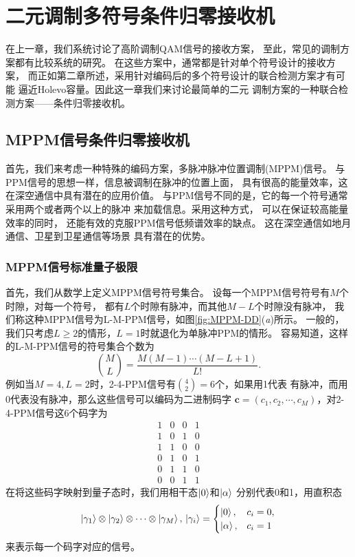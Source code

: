 \chapter{二元调制多符号条件归零接收机}
\label{chp:cpn}
在上一章，我们系统讨论了高阶调制QAM信号的接收方案，
至此，常见的调制方案都有比较系统的研究。
在这些方案中，通常都是针对单个符号设计的接收方案，
而正如第二章所述，采用针对编码后的多个符号设计的联合检测方案才有可能
逼近Holevo容量。因此这一章我们来讨论最简单的二元
调制方案的一种联合检测方案——条件归零接收机。


\section{MPPM信号条件归零接收机}
首先，我们来考虑一种特殊的编码方案，多脉冲脉冲位置调制(MPPM)信号。
与PPM信号的思想一样，信息被调制在脉冲的位置上面，
具有很高的能量效率，这在深空通信中具有潜在的应用价值\cite{hemmati2006deep}。
与PPM信号不同的是，它的每一个符号通常采用两个或者两个以上的脉冲
来加载信息。采用这种方式，
可以在保证较高能量效率的同时，
还能有效的克服PPM信号低频谱效率的缺点\cite{sugiyama1989mppm}。
这在深空通信如地月通信、卫星到卫星通信等场景
具有潜在的优势\cite{hemmati2006deep,waseda2011numerical}。

\subsection{MPPM信号标准量子极限}
首先，我们从数学上定义MPPM信号符号集合。
设每一个MPPM信号符号有$M$个时隙，对每一个符号，
都有$L$个时隙有脉冲，而其他$M-L$个时隙没有脉冲，
我们称这种MPPM信号为L-M-PPM信号，如图\ref{fig:MPPM-DD}(\textit{a})所示。
一般的，我们只考虑$L \ge 2$的情形，$L=1$时就退化为单脉冲PPM的情形。
容易知道，这样的L-M-PPM信号的符号集合个数为
\begin{equation}
\binom{M}{L} = \frac{M(M-1)\cdots(M-L+1)}{L!}.
\end{equation}
例如当$M=4, L=2$时，2-4-PPM信号有$\binom{4}{2}=6$个，如果用1代表
有脉冲，而用0代表没有脉冲，那么这些信号可以编码为二进制码字
$\bm{c} = (c_1, c_2, \cdots, c_M)$，对2-4-PPM信号这6个码字为
\begin{equation}
\begin{array}{cccc}
1 & 0 & 0 & 1 \\
1 & 0 & 1 & 0 \\
1 & 1 & 0 & 0 \\
0 & 1 & 0 & 1 \\
0 & 1 & 1 & 0 \\
0 & 0 & 1 & 1   
\end{array}
\end{equation}
在将这些码字映射到量子态时，我们用相干态$\ket{0}$和$\ket{\alpha}$
分别代表0和1，用直积态
\begin{equation}
\ket{\gamma_1}\otimes\ket{\gamma_2}\otimes\cdots\otimes\ket{\gamma_M}, \\
\ket{\gamma_i} = \begin{cases}
                    \ket{0}, & c_i=0, \\
                    \ket{\alpha}, & c_i=1
                \end{cases}
\end{equation}
来表示每一个码字对应的信号。

